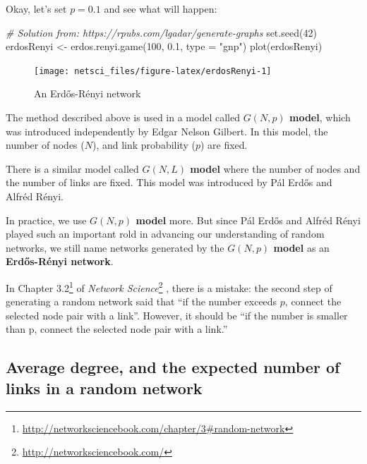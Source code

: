 \documentclass[
]{krantz}
\makeatletter
\newenvironment{Shaded}{\begin{snugshade}}{\end{snugshade}}
\newcommand{\AttributeTok}[1]{\textcolor[rgb]{0.61,0.61,0.61}{#1}}
\newcommand{\CommentTok}[1]{\textcolor[rgb]{0.37,0.37,0.37}{\textit{#1}}}
\newcommand{\DecValTok}[1]{\textcolor[rgb]{0.06,0.06,0.06}{#1}}
\newcommand{\FloatTok}[1]{\textcolor[rgb]{0.06,0.06,0.06}{#1}}
\newcommand{\FunctionTok}[1]{\textcolor[rgb]{0,0,0}{#1}}
\newcommand{\NormalTok}[1]{#1}
\newcommand{\OtherTok}[1]{\textcolor[rgb]{0.37,0.37,0.37}{#1}}
\newcommand{\StringTok}[1]{\textcolor[rgb]{0.5,0.5,0.5}{#1}}
\renewcommand{\href}[2]{#2\footnote{\url{#1}}}
\newenvironment{kframe}{%
\medskip{}
\setlength{\fboxsep}{.8em}
 \def\at@end@of@kframe{}%
 \ifinner\ifhmode%
  \def\at@end@of@kframe{\end{minipage}}%
  \begin{minipage}{\columnwidth}%
 \fi\fi%
 \def\FrameCommand##1{\hskip\@totalleftmargin \hskip-\fboxsep
 \colorbox{shadecolor}{##1}\hskip-\fboxsep
     \hskip-\linewidth \hskip-\@totalleftmargin \hskip\columnwidth}%
 \MakeFramed {\advance\hsize-\width
   \@totalleftmargin\z@ \linewidth\hsize
   \@setminipage}}%
 {\par\unskip\endMakeFramed%
 \at@end@of@kframe}
\renewenvironment{Shaded}{\begin{kframe}}{\end{kframe}}
\newenvironment{rmdblock}[1]
  {
  \begin{itemize}
  \renewcommand{\labelitemi}{
    \raisebox{-.7\height}[0pt][0pt]{
      {\setkeys{Gin}{width=3em,keepaspectratio}\texttt{[image: images/\#1]}}
    }
  }
  \setlength{\fboxsep}{1em}
  \begin{kframe}
  \item
  }
  {
  \end{kframe}
  \end{itemize}
  }
\newenvironment{rmdcaution}
  {\begin{rmdblock}{caution}}
  {\end{rmdblock}}
\makeatother
\begin{document}
Okay, let's set \(p=0.1\) and see what will happen:

\begin{Shaded}
\begin{Highlighting}[]
\CommentTok{\# Solution from: https://rpubs.com/lgadar/generate{-}graphs}
\FunctionTok{set.seed}\NormalTok{(}\DecValTok{42}\NormalTok{)}
\NormalTok{erdosRenyi }\OtherTok{\textless{}{-}} \FunctionTok{erdos.renyi.game}\NormalTok{(}\DecValTok{100}\NormalTok{, }\FloatTok{0.1}\NormalTok{, }\AttributeTok{type =} \StringTok{"gnp"}\NormalTok{)}
\FunctionTok{plot}\NormalTok{(erdosRenyi)}
\end{Highlighting}
\end{Shaded}

\begin{figure}

{\centering \texttt{[image: netsci\_files/figure-latex/erdosRenyi-1]} 

}

\caption{An Erdős-Rényi network}\label{fig:erdosRenyi}
\end{figure}

The method described above is used in a model called \textbf{\(G(N,p)\) model}, which was introduced independently by Edgar Nelson Gilbert. In this model, the number of nodes (\(N\)), and link probability (\(p\)) are fixed.

There is a similar model called \textbf{\(G(N,L)\) model} where the number of nodes and the number of links are fixed. This model was introduced by Pál Erdős and Alfréd Rényi.

In practice, we use \textbf{\(G(N,p)\) model} more. But since Pál Erdős and Alfréd Rényi played such an important rold in advancing our understanding of random networks, we still name networks generated by the \textbf{\(G(N,p)\) model} as an \textbf{Erdős-Rényi network}.

\begin{rmdcaution}
In \href{http://networksciencebook.com/chapter/3\#random-network}{Chapter 3.2} of \href{http://networksciencebook.com/}{\emph{Network Science}} , there is a mistake: the second step of generating a random network said that ``if the number exceeds \(p\), connect the selected node pair with a link''. However, it should be ``if the number is smaller than p, connect the selected node pair with a link.''
\end{rmdcaution}

\hypertarget{average-degree-and-the-expected-number-of-links-in-a-random-network}{%
\subsection{Average degree, and the expected number of links in a random network}\label{average-degree-and-the-expected-number-of-links-in-a-random-network}}
\end{document}
